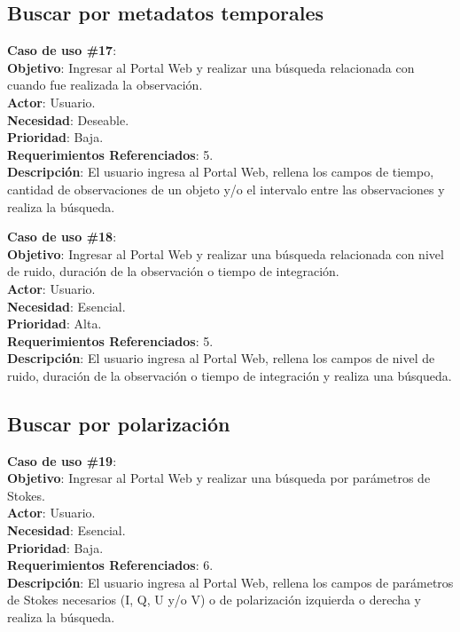 \subsection{Buscar por metadatos temporales}
\noindent\textbf{Caso de uso \#17}: \\
\textbf{Objetivo}: Ingresar al Portal Web y realizar una búsqueda relacionada con cuando fue realizada la observación. \\
\textbf{Actor}: Usuario.\\
\textbf{Necesidad}: Deseable.\\
\textbf{Prioridad}: Baja.\\
\textbf{Requerimientos Referenciados}: 5. \\
\textbf{Descripción}: El usuario ingresa al Portal Web, rellena los campos de tiempo, cantidad de observaciones de un objeto y/o el intervalo entre las observaciones y realiza la búsqueda.
\vspace{1.0cm}

\noindent\textbf{Caso de uso \#18}: \\
\textbf{Objetivo}: Ingresar al Portal Web y realizar una búsqueda relacionada con nivel de ruido, duración de la observación o tiempo de integración.\\
\textbf{Actor}: Usuario.\\
\textbf{Necesidad}: Esencial.\\
\textbf{Prioridad}: Alta.\\
\textbf{Requerimientos Referenciados}: 5. \\
\textbf{Descripción}: El usuario ingresa al Portal Web, rellena los campos de nivel de ruido, duración de la observación o tiempo de integración y realiza una búsqueda.
\vspace{1.0cm}

\subsection{Buscar por polarización}
\noindent\textbf{Caso de uso \#19}: \\
\textbf{Objetivo}: Ingresar al Portal Web y realizar una búsqueda por parámetros de Stokes. \\
\textbf{Actor}: Usuario.\\
\textbf{Necesidad}: Esencial.\\
\textbf{Prioridad}: Baja.\\
\textbf{Requerimientos Referenciados}: 6. \\
\textbf{Descripción}: El usuario ingresa al Portal Web, rellena los campos de parámetros de Stokes necesarios (I, Q, U y/o V) o de polarización izquierda o derecha y realiza la búsqueda.
\vspace{1.0cm}

